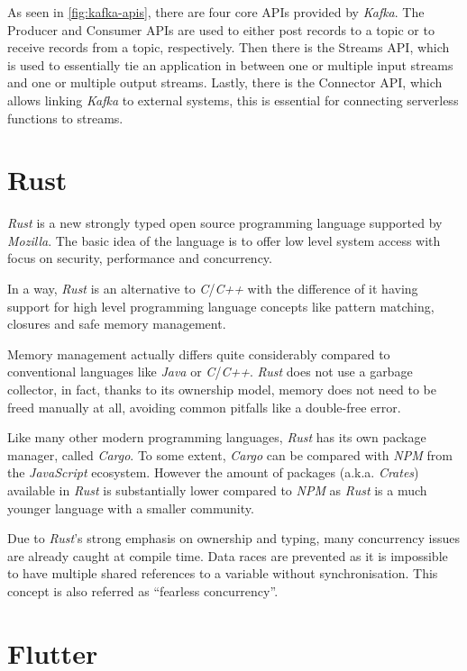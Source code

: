 As seen in \autoref{fig:kafka-apis}, there are four core APIs provided by \textit{Kafka}. The
Producer and Consumer APIs are used to either post records to a topic or to receive records from a
topic, respectively. Then there is the Streams API, which is used to essentially tie an application
in between one or multiple input streams and one or multiple output streams. Lastly, there is the
Connector API, which allows linking \textit{Kafka} to external systems, this is essential for
connecting serverless functions to streams.
\cite{kafka-introduction}

\section{Rust}

\textit{Rust} is a new strongly typed open source programming language supported by
\textit{Mozilla}. The basic idea of the language is to offer low level system access with focus on
security, performance and concurrency. \cite{rustbook1, forkjoin}

In a way, \textit{Rust} is an alternative to \textit{C}/\textit{C++} with the difference of it
having support for high level programming language concepts like pattern matching, closures and safe
memory management. \cite{rustbook1, forkjoin}

Memory management actually differs quite considerably compared to conventional languages like
\textit{Java} or \textit{C}/\textit{C++}. \textit{Rust} does not use a garbage collector, in fact,
thanks to its ownership model, memory does not need to be freed manually at all, avoiding common
pitfalls like a double-free error.

Like many other modern programming languages, \textit{Rust} has its own package manager, called
\textit{Cargo}. To some extent, \textit{Cargo} can be compared with \textit{NPM} from the
\textit{JavaScript} ecosystem. However the amount of packages (a.k.a. \textit{Crates}) available in
\textit{Rust} is substantially lower compared to \textit{NPM} as \textit{Rust} is a much younger
language with a smaller community.

Due to \textit{Rust}'s strong emphasis on ownership and typing, many concurrency issues are already
caught at compile time. Data races are prevented as it is impossible to have multiple shared
references to a variable without synchronisation. This concept is also referred as “fearless
concurrency”. \cite{rustbook2}

\section{Flutter}

